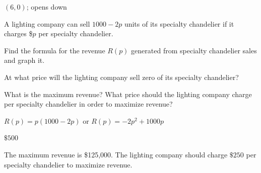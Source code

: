 \begin{solution}
    $(6,0)$; opens down
\end{solution}



\begin{exercise} A lighting company can sell $1000-2p$ units of its specialty chandelier if it charges \$$p$ per specialty chandelier.
\begin{parts}
\item Find the formula for the revenue $R(p)$ generated from specialty chandelier sales and graph it.
\item At what price will the lighting company sell zero of its specialty chandelier?
\item What is the maximum revenue? What price should the lighting company charge per specialty chandelier in order to maximize revenue?
\end{parts}
\end{exercise}

\begin{solution}
    \begin{parts}
        \item $R(p)=p(1000-2p)$ or $R(p)=-2p^2+1000p$
        \item $\$500$
        \item The maximum revenue is \$125,000. The lighting company should charge $\$250$ per specialty chandelier to maximize revenue.
    \end{parts}
\end{solution}